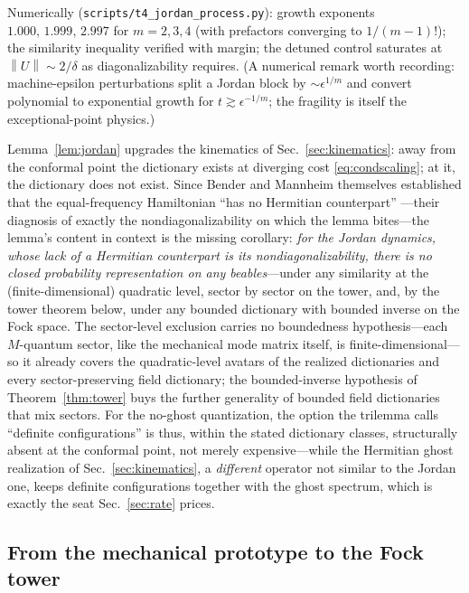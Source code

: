 \documentclass[11pt]{article}
\theoremstyle{definition}
\theoremstyle{remark}
\newcommand{\norm}[1]{\left\lVert #1 \right\rVert}
\begin{document}
Numerically (\texttt{scripts/t4\_jordan\_process.py}): growth exponents
$1.000,\,1.999,\,2.997$ for $m=2,3,4$ (with prefactors converging
to $1/(m{-}1)!$); the similarity inequality
verified with margin; the detuned control saturates at
$\norm{U}\sim2/\delta$ as diagonalizability requires. (A numerical
remark worth recording: machine-epsilon perturbations split a
Jordan block by $\sim\epsilon^{1/m}$ and convert polynomial to
exponential growth for $t\gtrsim\epsilon^{-1/m}$; the fragility is
itself the exceptional-point physics.)

Lemma~\ref{lem:jordan} upgrades the kinematics of
Sec.~\ref{sec:kinematics}: away from the conformal point the
dictionary exists at diverging cost \eqref{eq:condscaling}; at it,
the dictionary does not exist. Since Bender and Mannheim themselves
established that the equal-frequency Hamiltonian ``has no Hermitian
counterpart'' \cite{BenderMannheim2008PRD}---their diagnosis of
exactly the nondiagonalizability on which the lemma bites---the
lemma's content in
context is the missing corollary: \emph{for the Jordan dynamics,
whose lack of a Hermitian counterpart is its nondiagonalizability,
there is no closed probability representation on any beables}---under
any similarity at the (finite-dimensional) quadratic level, sector by
sector on the tower, and, by the tower theorem below, under any
bounded dictionary with bounded inverse on
the Fock space. The sector-level exclusion carries no boundedness
hypothesis---each $M$-quantum sector, like the mechanical mode matrix
itself, is finite-dimensional---so it already covers the
quadratic-level avatars of the realized dictionaries and every
sector-preserving field dictionary; the
bounded-inverse hypothesis of Theorem~\ref{thm:tower} buys the
further generality of bounded field dictionaries that mix sectors. For the
no-ghost quantization, the option the
trilemma calls ``definite
configurations'' is thus, within the stated dictionary classes,
structurally absent at the conformal point, not merely
expensive---while the Hermitian ghost realization of
Sec.~\ref{sec:kinematics}, a \emph{different} operator not similar
to the Jordan one, keeps definite configurations together with the
ghost spectrum, which is exactly the seat
Sec.~\ref{sec:rate} prices.

\subsection{From the mechanical prototype to the Fock tower}
\label{sec:tower}
\end{document}
